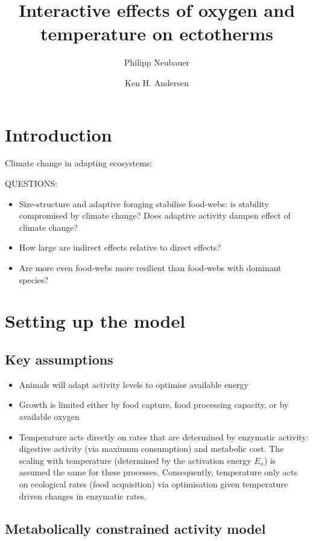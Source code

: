 \documentclass{article}\usepackage[]{graphicx}\usepackage[]{color}
\title{Interactive effects of oxygen and temperature on ectotherms}
\author{Philipp Neubauer \and Ken H. Andersen}
\begin{document}
\maketitle

\section{Introduction}

Climate change in adapting ecosystems: 


QUESTIONS:
\begin{itemize}
\item Size-structure and adaptive foraging stabilise food-webs: is stability compromised by climate change? Does adaptive activity dampen effect of climate change?
\item How large are indirect effects relative to direct effects?
\item Are more even food-webs more resilient than food-webs with dominant species?
\end{itemize}

\section{Setting up the model}

\subsection{Key assumptions}
\begin{itemize}
\item Animals will adapt activity levels to optimise available energy
\item Growth is limited either by food capture, food processing capacity, or by available oxygen
\item Temperature acts directly on rates that are determined by enzymatic activity: digestive activity (via maximum consumption) and metabolic cost. The scaling with temperature (determined by the activation energy $E_a$) is assumed the same for these processes. Consequently, temperature only acts on ecological rates (food acquisition) via optimisation given temperature driven changes in enzymatic rates.


\end{itemize}

\subsection{Metabolically constrained activity model}
\end{document}
